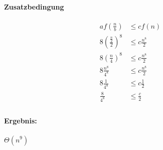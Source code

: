\documentclass[12pt,letterpaper]{article}
\begin{document}
\paragraph{Zusatzbedingung}
\begin{align}
    a f(\frac{n}{b})             & \leq c f(n)          \\
    8(\frac{\frac{n}{2}}{2})^{8} & \leq c \frac{n^8}{2} \\
    8(\frac{n}{4})^{8}           & \leq c \frac{n^8}{2} \\
    8\frac{n^8}{4^8}             & \leq c \frac{n^8}{2} \\
    8\frac{1}{4^8}               & \leq c \frac{1}{2}   \\
    \frac{8}{4^8}                & \leq \frac{c}{2}     \\
\end{align}


\paragraph{Ergebnis:}
$ \Theta(n^9)$
\end{document}

